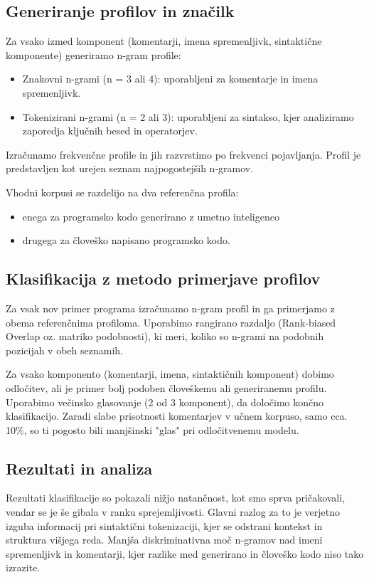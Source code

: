 \documentclass[sigconf,nonacm]{acmart}
\begin{document}
\subsection{Generiranje profilov in značilk}
Za vsako izmed komponent (komentarji, imena spremenljivk, sintaktične komponente) generiramo n-gram profile:
\begin{itemize}
	\item Znakovni n-grami (n = 3 ali 4): uporabljeni za komentarje in imena spremenljivk.
	\item Tokenizirani n-grami (n = 2 ali 3): uporabljeni za sintakso, kjer analiziramo zaporedja ključnih besed in operatorjev.
\end{itemize}
Izračunamo frekvenčne profile in jih razvrstimo po frekvenci pojavljanja. Profil je predstavljen kot urejen seznam najpogostejših n-gramov.

Vhodni korpusi se razdelijo na dva referenčna profila:
\begin{itemize}
	\item enega za programsko kodo generirano z umetno inteligenco
	\item drugega za človeško napisano programsko kodo.
\end{itemize}

\subsection{Klasifikacija z metodo primerjave profilov}
Za vsak nov primer programa izračunamo n-gram profil in ga primerjamo z obema referenčnima profiloma. Uporabimo rangirano razdaljo (Rank-biased Overlap oz. matriko podobnosti), ki meri, koliko so n-grami na podobnih pozicijah v obeh seznamih.

Za vsako komponento (komentarji, imena, sintaktičnih komponent) dobimo odločitev, ali je primer bolj podoben človeškemu ali generiranemu profilu. Uporabimo večinsko glasovanje (2 od 3 komponent), da določimo končno klasifikacijo.
Zaradi slabe prisotnosti komentarjev v učnem korpuso, samo cca. 10\%, so ti pogosto bili manjšinski "glas" pri odločitvenemu modelu.

\subsection{Rezultati in analiza}
Rezultati klasifikacije so pokazali nižjo natančnost, kot smo sprva pričakovali, vendar se je še gibala v ranku sprejemljivosti. Glavni razlog za to je verjetno izguba informacij pri sintaktični tokenizaciji, kjer se odstrani kontekst in struktura višjega reda.
Manjša diskriminativna moč n-gramov nad imeni spremenljivk in komentarji, kjer razlike med generirano in človeško kodo niso tako izrazite.
\end{document}
